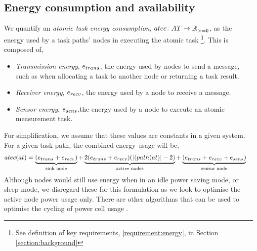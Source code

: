 \subsection{Energy consumption and availability}
\label{section:energy_consumption}

We quantify an \textit{atomic task energy consumption}, $\formalAtomicTaskEnergyConsumption{}{}$, as the energy used by a task paths' nodes in executing the atomic task \footnote{See definition of key requirements, \ref{requirement:energy}, in Section \ref{section:background}}. This is composed of,
 \begin{itemize}
 	\item \textit{Transmission energy}, $e_{trans}$, the energy used by nodes to  send a message, such as when allocating a task to another node or returning a task result. 
 	\item \textit{Receiver energy}, $e_{recv}$, the energy used by a node to receive a message. 
 	 \item \textit{Sensor energy}, $e_{sens}$,the energy used by a node to execute an atomic measurement task.
 \end{itemize}
For simplification, we assume that these values are constants in a given system. For a given task-path, the combined energy usage will be,
\begin{align}
\functionAtomicTaskEnergyConsumptionSignature{}{} 
&= 
\underbrace{(\varTransmissionEnergy{}{} + \varReceiverEnergy{}{})}_{\text{sink node}}
+ \underbrace{
	2 (\varTransmissionEnergy{}{} + \varReceiverEnergy{}{})
 	(\funcSize{(\functionTaskArc{}{}}{} -2)
}_{\text{active nodes}}
+ \underbrace{
	 (
	 	\varTransmissionEnergy{}{}
	 	+ \varReceiverEnergy{}{}
	 	+ \varSensorEnergy{}{}
	 )
 }_{\text{sensor node}}  
\end{align}
Although nodes would still use energy when in an idle power saving mode, or sleep mode, we disregard these for this formulation as we look to optimise the active node power usage only. There are other algorithms that can be used to optimise the cycling of power cell usage \citep{Escolar2014}.

\newcommand{\formalAgentEnergyAvailable}[2]{
	\functionFormal{\mathit{fe}}
	{\setAgents{}{}}
	{\setRealNumbersUnit{}{}}
}
\newcommand{\functionAgentEnergyAvailable}[2]{
	\functionSignature{\mathit{fe}_{\varTime{}{}}}
	{\varAgent{}{}}
}
\newcommand{\functionEnergyVariability}[2]{
	\ifx \\#1\\
	\functionSignature{rev_{\varTime{}{}}}
	{\setAgents{}{}}
	\else
	\functionSignature{rev_{\varTime{}{}}}{#1}
	\fi
}

